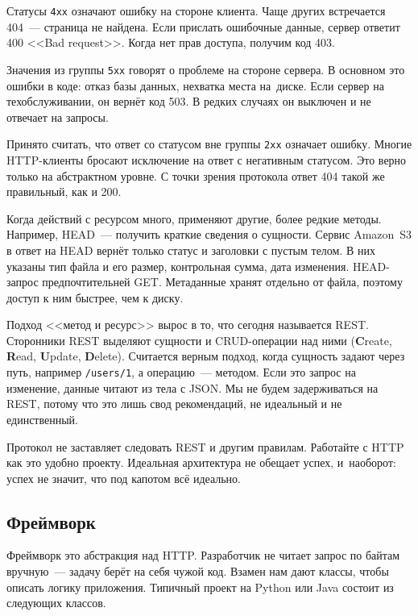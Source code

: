 Статусы \verb|4хх| означают ошибку на стороне клиента. Чаще других встречается
404~--- страница не найдена. Если прислать ошибочные данные, сервер ответит 400
<<Bad request>>. Когда нет прав доступа, получим код 403.

Значения из группы \verb|5хх| говорят о проблеме на стороне сервера. В
основном это ошибки в коде: отказ базы данных, нехватка места на~диске. Если
сервер на техобслуживании, он вернёт код 503. В редких случаях он выключен и
не отвечает на запросы.

Принято считать, что ответ со статусом вне группы \verb|2хх| означает
ошибку. Многие HTTP-клиенты бросают исключение на ответ с негативным статусом.
Это верно только на абстрактном уровне. С точки зрения протокола ответ 404 такой
же правильный, как и 200.


Когда действий с ресурсом много, применяют другие, более редкие
методы. Например, HEAD~--- получить краткие сведения о сущности. Сервис
Amazon~S3 в ответ на HEAD вернёт только статус и заголовки с пустым телом. В
них указаны тип файла и его размер, контрольная сумма, дата
изменения. HEAD-запрос предпочтительней GET. Метаданные хранят отдельно от
файла, поэтому доступ к ним быстрее, чем к диску.


Подход <<метод и ресурс>> вырос в то, что сегодня называется
REST. Сторонники REST выделяют сущности и
CRUD-операции над ними (\textbf{C}reate, \textbf{R}ead, \textbf{U}pdate,
\textbf{D}elete). Считается верным подход, когда сущность задают через путь,
например \verb|/users/1|, а операцию~--- методом. Если это запрос на
изменение, данные читают из тела с JSON. Мы не будем задерживаться на REST,
потому что это лишь свод рекомендаций, не идеальный и не единственный.


Протокол не заставляет следовать REST и другим правилам. Работайте с HTTP как
это удобно проекту. Идеальная архитектура не обещает успех, и~наоборот: успех не
значит, что под капотом всё идеально.

\subsection{Фреймворк}


Фреймворк это абстракция над HTTP. Разработчик не читает запрос по байтам
вручную~--- задачу берёт на себя чужой код. Взамен нам дают классы, чтобы
описать логику приложения. Типичный проект на Python или Java состоит из
следующих классов.

